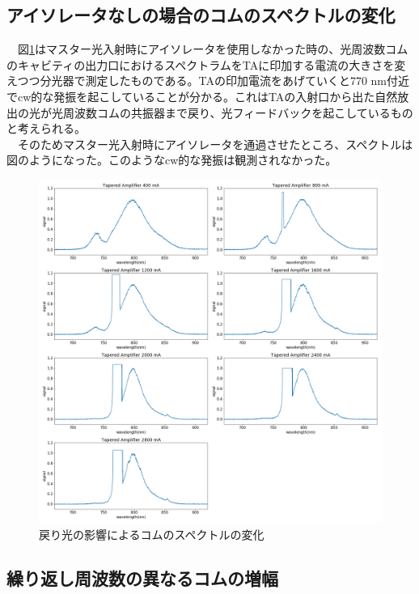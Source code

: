 \documentclass[uplatex, dvipdfmx, a4paper, report, papersize, 11pt]{jsbook}
\begin{document}
\subsection{アイソレータなしの場合のコムのスペクトルの変化}
　図\ref{spectrum_current_MODORI}はマスター光入射時にアイソレータを使用しなかった時の、光周波数コムのキャビティの出力口におけるスペクトラムをTAに印加する電流の大きさを変えつつ分光器で測定したものである。TAの印加電流をあげていくと$770$ nm付近でcw的な発振を起こしていることが分かる。これはTAの入射口から出た自然放出の光が光周波数コムの共振器まで戻り、光フィードバックを起こしているものと考えられる。\\
　そのためマスター光入射時にアイソレータを通過させたところ、スペクトルは図のようになった。このようなcw的な発振は観測されなかった。
\begin{figure}[htbp]
 \begin{center}
  \includegraphics[width=140mm]{figures/chapter4/spectrum_current_MODORI.png}
\end{center}
 \caption{戻り光の影響によるコムのスペクトルの変化}
 \label{spectrum_current_MODORI}
\end{figure}
\newpage
\subsection{繰り返し周波数の異なるコムの増幅}
\end{document}

